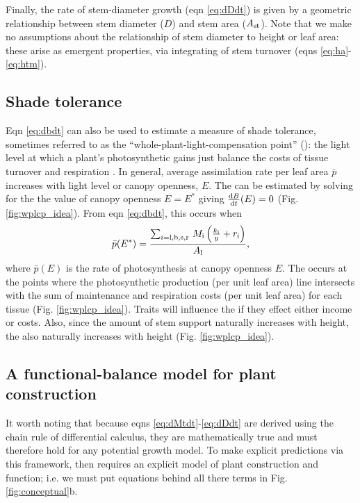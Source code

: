 \documentclass[a4paper,11pt]{article}
\begin{document}
Finally, the rate of stem-diameter growth (eqn \ref{eq:dDdt}) is given by a geometric relationship between stem diameter ($D$) and stem area ($A_{\rm st}$). Note that we make no assumptions about the relationship of stem diameter to height or leaf area: these arise as emergent properties, via integrating of stem turnover (eqns \ref{eq:ha}- \ref{eq:htm}).

\subsection{Shade tolerance}

Eqn \ref{eq:dbdt} can also be used to estimate a measure of shade tolerance, sometimes referred to as the ``whole-plant-light-compensation point'' ({\wplcp}): the light level at which a plant's photosynthetic gains just balance the costs of tissue turnover and respiration \citep{Givnish-1988, Baltzer-2007, Lusk-2013}. In general, average assimilation rate per leaf area $\bar{p}$ increases with light level or canopy openness, $E$. The {\wplcp} can be estimated by solving for the the value of canopy openness $E=E^*$ giving $\frac{{\rm d}B} {{\rm d}t}(E)=0$ (Fig. \ref{fig:wplcp_idea}). From eqn \ref{eq:dbdt}, this occurs when
\begin{equation}\label{eq:wplcp}
\bar{p}(E^*) =\frac{\sum_{i={\rm l,b,s,r}} \, M_{\rm i} \left(\frac{k_{\rm i}}{y} + r_{\rm i}\right)}{A_{\rm l}},
\end{equation}
where $\bar{p}(E)$ is the rate of photosynthesis at canopy openness $E$. The {\wplcp} occurs at the points where the photosynthetic production (per unit leaf area) line intersects with the sum of maintenance and respiration costs (per unit leaf area) for each tissue (Fig. \ref{fig:wplcp_idea}). Traits will influence the {\wplcp} if they effect either income or costs. Also, since the amount of stem support naturally increases with height, the {\wplcp} also naturally increases with height \citep{Givnish-1988} (Fig. \ref{fig:wplcp_idea}).

\subsection{A functional-balance model for plant construction}

It worth noting that because eqns \ref{eq:dMtdt}-\ref{eq:dDdt} are derived using the chain rule of differential calculus, they are mathematically true and must therefore hold for any potential growth model. To make explicit predictions via this framework, then requires an explicit model of plant construction and function; i.e. we must put equations behind all there terms in Fig. \ref{fig:conceptual}b.
\end{document}
